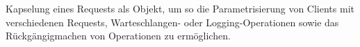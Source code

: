 \glqq Kapselung eines Requests als Objekt, um so die Parametrisierung von Clients mit verschiedenen Requests, Warteschlangen- oder Logging-Operationen sowie das Rückgängigmachen von Operationen zu ermöglichen.\grqq